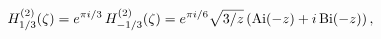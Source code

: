 \[\mathop{{H^{(2)}_{1/3}}\/}\nolimits\!\left(\zeta\right)=e^{\pi i/3}\mathop{{H^%
{(2)}_{-1/3}}\/}\nolimits\!\left(\zeta\right)=e^{\pi i/6}\sqrt{3/z}\left(%
\mathop{\mathrm{Ai}\/}\nolimits\!\left(-z\right)+i\mathop{\mathrm{Bi}\/}%
\nolimits\!\left(-z\right)\right),\]